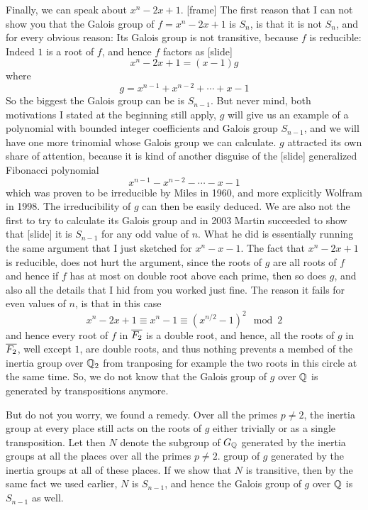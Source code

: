 \documentclass[../../main.tex]{subfiles}
\begin{document}
Finally, we can speak about $x^n -2x + 1$.  
[frame]
The first reason that I can not show you that the Galois group of $f = x^n - 2x + 1$ is $S_n$, is that it is not $S_n$, and for every obvious reason: 
Its Galois group is not transitive, because $f$ is reducible:
Indeed $1$ is a root of $f$, and hence $f$ factors as [slide]
\[
  x^n - 2x + 1 = \left( x-1 \right) g 
\]
where 
\[
  g = x^{n-1} + x^{n-2} + \cdots + x - 1
\]
So the biggest the Galois group can be is $S_{n-1}$.
But never mind, both motivations I stated at the beginning still apply, $g$ will give us an example of a polynomial with bounded integer coefficients and Galois group $S_{n-1}$, and we will have one more trinomial whose Galois group we can calculate.
$g$ attracted its own share of attention, because it is kind of another disguise of the [slide] generalized Fibonacci polynomial 
\[
  x^{n-1} - x^{n-2} - \cdots - x - 1
\]
which was proven to be irreducible by Miles in 1960, and more explicitly Wolfram in 1998.
The irreducibility of $g$ can then be easily deduced.
We are also not the first to try to calculate its Galois group and in 2003 Martin succeeded to show that [slide] it is $S_{n-1}$ for any odd value of $n$.
What he did is essentially running the same argument that I just sketched for $x^n - x - 1$.
The fact that $x^n - 2x + 1$ is reducible, does not hurt the argument, since the roots of $g$ are all roots of $f$ and hence if $f$ has at most on double root above each prime, then so does $g$, and also all the details that I hid from you worked just fine.
The reason it fails for even values of $n$, is that in this case
\[
  x^n - 2x + 1 \equiv x^n - 1 \equiv \left( x^{n/2} - 1\right)^2 \mod 2
\]
and hence every root of $f$ in $\overline{F_2}$ is a double root, and hence, all the roots of $g$ in $\overline{F_2}$, well except $1$, are double roots, and thus nothing prevents a membed of the inertia group over $\mathbb{Q}_2$ from tranposing for example the two roots in this circle at the same time.
So, we do not know that the Galois group of $g$ over $\mathbb{Q}$ is generated by transpositions anymore. 

But do not you worry, we found a remedy.
Over all the primes $p \neq 2$, the inertia group at every place still acts on the roots of $g$ either trivially or as a single transposition.
Let then $N$ denote the subgroup of $G_{\mathbb{Q}}$ generated by the inertia groups at all the places over all the primes $p \neq 2$. 
group of $g$ generated by the inertia groups at all of these places.
If we show that $N$ is transitive, then by the same fact we used earlier, $N$ is $S_{n-1}$, and hence the Galois group of $g$ over $\mathbb{Q}$ is $S_{n-1}$ as well.
\end{document}
